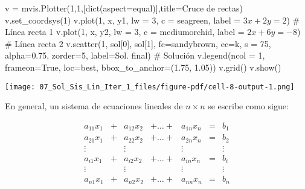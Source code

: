 \documentclass[
  letterpaper,
  DIV=11,
  numbers=noendperiod]{scrreprt}
\newenvironment{Shaded}{\begin{snugshade}}{\end{snugshade}}
\newcommand{\BuiltInTok}[1]{\textcolor[rgb]{0.00,0.23,0.31}{#1}}
\newcommand{\CommentTok}[1]{\textcolor[rgb]{0.37,0.37,0.37}{#1}}
\newcommand{\DecValTok}[1]{\textcolor[rgb]{0.68,0.00,0.00}{#1}}
\newcommand{\FloatTok}[1]{\textcolor[rgb]{0.68,0.00,0.00}{#1}}
\newcommand{\NormalTok}[1]{\textcolor[rgb]{0.00,0.23,0.31}{#1}}
\newcommand{\OperatorTok}[1]{\textcolor[rgb]{0.37,0.37,0.37}{#1}}
\newcommand{\StringTok}[1]{\textcolor[rgb]{0.13,0.47,0.30}{#1}}
\newcommand{\VariableTok}[1]{\textcolor[rgb]{0.07,0.07,0.07}{#1}}
\begin{document}
\begin{Shaded}
\begin{Highlighting}[]
\NormalTok{v }\OperatorTok{=}\NormalTok{ mvis.Plotter(}\DecValTok{1}\NormalTok{,}\DecValTok{1}\NormalTok{,[}\BuiltInTok{dict}\NormalTok{(aspect}\OperatorTok{=}\StringTok{\textquotesingle{}equal\textquotesingle{}}\NormalTok{)],title}\OperatorTok{=}\StringTok{\textquotesingle{}Cruce de rectas\textquotesingle{}}\NormalTok{) }
\NormalTok{v.set\_coordsys(}\DecValTok{1}\NormalTok{)}
\NormalTok{v.plot(}\DecValTok{1}\NormalTok{, x, y1, lw }\OperatorTok{=} \DecValTok{3}\NormalTok{, c }\OperatorTok{=} \StringTok{\textquotesingle{}seagreen\textquotesingle{}}\NormalTok{, label }\OperatorTok{=} \StringTok{\textquotesingle{}$3x+2y=2$\textquotesingle{}}\NormalTok{) }\CommentTok{\# Línea recta 1}
\NormalTok{v.plot(}\DecValTok{1}\NormalTok{, x, y2, lw }\OperatorTok{=} \DecValTok{3}\NormalTok{, c }\OperatorTok{=} \StringTok{\textquotesingle{}mediumorchid\textquotesingle{}}\NormalTok{, label }\OperatorTok{=} \StringTok{\textquotesingle{}$2x+6y={-}8$\textquotesingle{}}\NormalTok{) }\CommentTok{\# Línea recta 2}
\NormalTok{v.scatter(}\DecValTok{1}\NormalTok{, sol[}\DecValTok{0}\NormalTok{], sol[}\DecValTok{1}\NormalTok{], fc}\OperatorTok{=}\StringTok{\textquotesingle{}sandybrown\textquotesingle{}}\NormalTok{, ec}\OperatorTok{=}\StringTok{\textquotesingle{}k\textquotesingle{}}\NormalTok{, s }\OperatorTok{=} \DecValTok{75}\NormalTok{, alpha}\OperatorTok{=}\FloatTok{0.75}\NormalTok{, zorder}\OperatorTok{=}\DecValTok{5}\NormalTok{, label}\OperatorTok{=}\StringTok{\textquotesingle{}Sol. final\textquotesingle{}}\NormalTok{) }\CommentTok{\# Solución}
\NormalTok{v.legend(ncol }\OperatorTok{=} \DecValTok{1}\NormalTok{, frameon}\OperatorTok{=}\VariableTok{True}\NormalTok{, loc}\OperatorTok{=}\StringTok{\textquotesingle{}best\textquotesingle{}}\NormalTok{, bbox\_to\_anchor}\OperatorTok{=}\NormalTok{(}\FloatTok{1.75}\NormalTok{, }\FloatTok{1.05}\NormalTok{))}
\NormalTok{v.grid()}
\NormalTok{v.show()}
\end{Highlighting}
\end{Shaded}

\texttt{[image: 07\_Sol\_Sis\_Lin\_Iter\_1\_files/figure-pdf/cell-8-output-1.png]}

En general, un sistema de ecuaciones lineales de \(n \times n\) se
escribe como sigue:

\[
\begin{array}{ccccccc}
a_{11}x_1 & + & a_{12}x_2 & +  \dots  + & a_{1n}x_n & = & b_1 \\
a_{21}x_1 & + & a_{22}x_2 & +  \dots + & a_{2n}x_n & = & b_2 \\
\vdots & & \vdots &  & \vdots & & \vdots \\
a_{i1}x_1 & + & a_{i2}x_2 & +  \dots + & a_{in}x_n & = & b_i \\
\vdots & & \vdots &  & \vdots & & \vdots \\
a_{n1}x_1 & + & a_{n2}x_2 & + \dots + & a_{nn}x_n & = & b_n
\end{array}
\]
\end{document}
